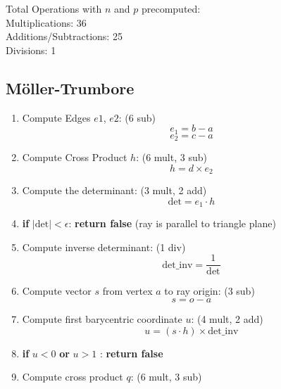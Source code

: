 \documentclass{article}
\begin{document}
Total Operations with $n$ and $p$ precomputed:\\
Multiplications: 36\\
Additions/Subtractions: 25\\
Divisions: 1


\subsection*{Möller-Trumbore}
\begin{enumerate}
    \item Compute Edges $e1$, $e2$: (6 sub)
            \begin{equation*}
                e_1 = b - a
            \end{equation*}
                        \begin{equation*}
                e_2 = c - a
            \end{equation*}
    \item Compute Cross Product $h$: (6 mult, 3 sub)
            \begin{equation*}
                h = d \times e_2
            \end{equation*}
    \item Compute the determinant: (3 mult, 2 add)
        \begin{equation*}
            \text{det} = e_1 \cdot h
        \end{equation*}
    \item \textbf{if } $|\text{det}| < \epsilon$: \textbf{return false} (ray is parallel to triangle plane)
    \item Compute inverse determinant: (1 div)
        \begin{equation*}
            \text{det\_inv} = \frac{1}{\text{det}}
        \end{equation*}
    \item Compute vector $s$ from vertex $a$ to ray origin: (3 sub)
        \begin{equation*}
            s = o - a
        \end{equation*}
    \item Compute first barycentric coordinate $u$: (4 mult, 2 add)
        \begin{equation*}
            u = (s \cdot h) \times \text{det\_inv}
        \end{equation*}
    \item \textbf{if } $u < 0$ \textbf{or} $u > 1$ : \textbf{return false}
    \item Compute cross product $q$: (6 mult, 3 sub)

\end{enumerate}
\end{document}

